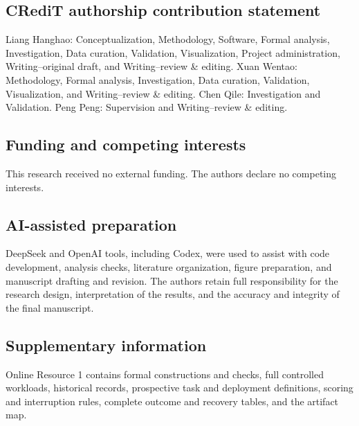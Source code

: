 \documentclass[10pt,a4paper,twocolumn]{article}
\begin{document}
\subsection*{CRediT authorship contribution statement}
Liang Hanghao: Conceptualization, Methodology, Software, Formal analysis, Investigation, Data curation, Validation, Visualization, Project administration, Writing--original draft, and Writing--review \& editing. Xuan Wentao: Methodology, Formal analysis, Investigation, Data curation, Validation, Visualization, and Writing--review \& editing. Chen Qile: Investigation and Validation. Peng Peng: Supervision and Writing--review \& editing.

\subsection*{Funding and competing interests}
This research received no external funding. The authors declare no competing interests.

\subsection*{AI-assisted preparation}
DeepSeek and OpenAI tools, including Codex, were used to assist with code development, analysis checks, literature organization, figure preparation, and manuscript drafting and revision. The authors retain full responsibility for the research design, interpretation of the results, and the accuracy and integrity of the final manuscript.

\subsection*{Supplementary information}
Online Resource 1 contains formal constructions and checks, full controlled workloads, historical records, prospective task and deployment definitions, scoring and interruption rules, complete outcome and recovery tables, and the artifact map.
\end{document}
